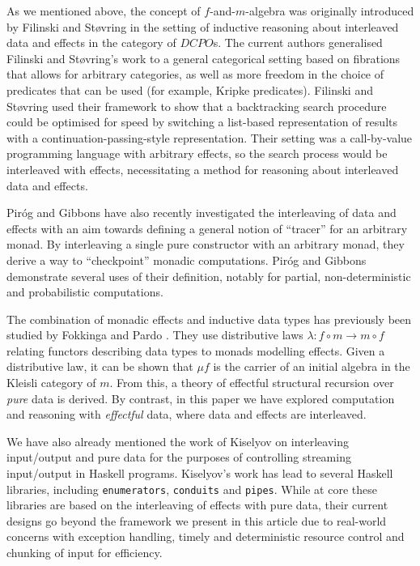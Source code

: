 As we mentioned above, the concept of $f$-and-$m$-algebra was
originally introduced by Filinski and St\o{}vring
\cite{filinski07inductive} in the setting of inductive reasoning about
interleaved data and effects in the category of $\mathit{DCPO}$s. The
current authors \cite{atkey12fibrational} generalised Filinski and
St\o{}vring's work to a general categorical setting based on
fibrations that allows for arbitrary categories, as well as more
freedom in the choice of predicates that can be used (for example,
Kripke predicates). Filinski and St\o{}vring used their framework to
show that a backtracking search procedure could be optimised for speed
by switching a list-based representation of results with a
continuation-passing-style representation. Their setting was a
call-by-value programming language with arbitrary effects, so the
search process would be interleaved with effects, necessitating a
method for reasoning about interleaved data and effects.

Pir{\'o}g and Gibbons \cite{pirog12tracing} have also recently
investigated the interleaving of data and effects with an aim towards
defining a general notion of ``tracer'' for an arbitrary monad. By
interleaving a single pure constructor with an arbitrary monad, they
derive a way to ``checkpoint'' monadic computations. Pir{\'o}g and
Gibbons demonstrate several uses of their definition, notably for
partial, non-deterministic and probabilistic computations.


The combination of monadic effects and inductive data types has
previously been studied by Fokkinga \cite{fokkinga94monadic} and Pardo
\cite{pardo04combining}. They use distributive laws $\lambda : f \circ
m \rightarrow m \circ f$ relating functors describing data types to
monads modelling effects. Given a distributive law, it can be shown
that $\mu f$ is the carrier of an initial algebra in the Kleisli
category of $m$. From this, a theory of effectful structural recursion
over \emph{pure} data is derived. By contrast, in this paper we have
explored computation and reasoning with \emph{effectful} data, where
data and effects are interleaved.

We have also already mentioned the work of Kiselyov
\cite{kiselyov12iteratees} on interleaving input/output and pure data
for the purposes of controlling streaming input/output in Haskell
programs. Kiselyov's work has lead to several Haskell libraries,
including \texttt{enumerators}, \texttt{conduits} and
\texttt{pipes}. While at core these libraries are based on the
interleaving of effects with pure data, their current designs go
beyond the framework we present in this article due to real-world
concerns with exception handling, timely and deterministic resource
control and chunking of input for efficiency.

